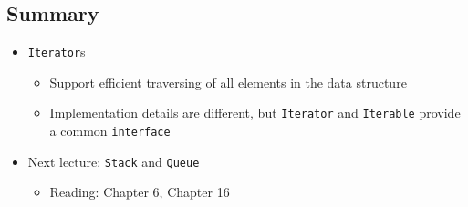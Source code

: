 \documentclass[10pt]{article}
\begin{document}
\subsection*{Summary}
\begin{itemize}
    \item \texttt{Iterator}s
    \begin{itemize}
        \item Support efficient traversing of all elements in the data structure
        \item Implementation details are different, but \texttt{Iterator} and \texttt{Iterable} provide a common \texttt{interface}
    \end{itemize}
    \item Next lecture: \texttt{Stack} and \texttt{Queue}
    \begin{itemize}
        \item Reading: Chapter 6, Chapter 16
    \end{itemize}
\end{itemize}
\end{document}
